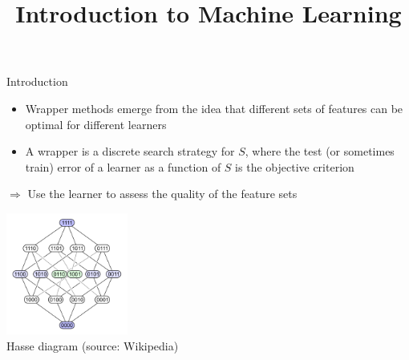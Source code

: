 \documentclass[11pt,compress,t,notes=noshow, xcolor=table]{beamer}
\title{Introduction to Machine Learning}
\date{}
\begin{document}

  \begin{vbframe}{Introduction}

    \begin{itemize}
      \item Wrapper methods emerge from the idea that different sets of features can be optimal for different learners
      \item A wrapper is a discrete search strategy for $S$, where the test (or sometimes train) error of a learner as a function of $S$ is the objective criterion
    \end{itemize}
    $\Rightarrow$ Use the learner to assess the quality of the feature sets

    \begin{center}
     \includegraphics[width = 0.3\textwidth]{figure/searchspace_binary.png}\\
     \scriptsize{Hasse diagram (source: Wikipedia)}
    \end{center}
    
\end{vbframe}
\end{document}
